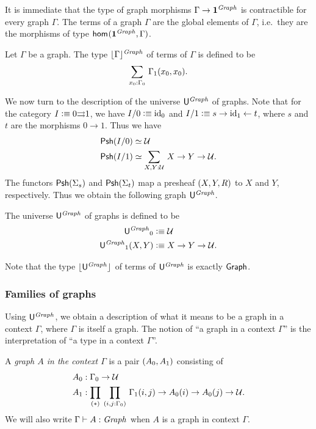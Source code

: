 It is immediate that the type of graph morphisms $\Gamma\to\unit^\mfGraph$ is
contractible for every graph $\Gamma$. The terms of a graph $\Gamma$ are the
global elements of $\Gamma$, i.e.~they are the morphisms of type 
$\ctxhom{\unit^\mfGraph}{\Gamma}$.

\begin{defn}
Let $\Gamma$ be a graph. The type $\terms[\mfGraph]{\Gamma}$ of terms of $\Gamma$ is
defined to be
\begin{equation*}
\sm{x_0:\Gamma_0}\Gamma_1(x_0,x_0).
\end{equation*}
\end{defn}

We now turn to the description of the universe $\gobjclass$ of graphs. Note
that for the category $I\defeq 0{\rightrightarrows}1$, we have
$I/0\defeq\catid{0}$ and $I/1\defeq s\rightarrow\catid{1}\leftarrow t$, where
$s$ and $t$ are the morphisms $0\to 1$. Thus we have 
\begin{align*}
\psh(I/0) & \eqvsym \type\\
\psh(I/1) & \eqvsym \sm{X,Y:\type}X\to Y\to\type.
\end{align*}
The functors $\psh(\Sigma_s)$ and $\psh(\Sigma_t)$ map a presheaf 
$\pairr{X,Y,R}$ to $X$ and $Y$, respectively. 
Thus we obtain the following graph $\gobjclass$.

\begin{defn}
The universe $\gobjclass$ of graphs is defined to be
\begin{align*}
{\gobjclass}_0 & \defeq \type\\
{\gobjclass}_1(X,Y) & \defeq X\to Y\to\type.
\end{align*}
\end{defn}

Note that the type $\terms{\gobjclass}$ of terms of $\gobjclass$ is 
exactly $\tfGraph$. 

\subsubsection{Families of graphs}
Using $\gobjclass$, we obtain a description of what
it means to be a graph in a context $\Gamma$, where $\Gamma$ is itself a
graph. The notion of ``a graph in a context $\Gamma$'' is the interpretation
of ``a type in a context $\Gamma$''.

\begin{defn}
A \emph{graph $A$ in the context $\Gamma$} is a pair $\pairr{A_0,A_1}$ consisting
of 
\begin{align*}
A_0 & :\Gamma_0\to\type\\
A_1 & :\prd*{i,j:\Gamma_0}\Gamma_1(i,j)\to A_0(i)\to A_0(j)\to\type.
\end{align*}
We will also write $\Gamma\vdash A:\mfGraph$ when $A$ is a graph in context
$\Gamma$.
\end{defn}

